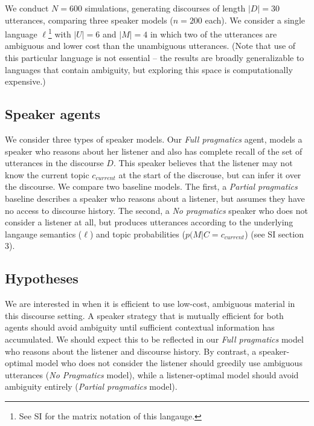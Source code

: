 \documentclass[10pt, letterpaper]{article}
\begin{document}
We conduct \(N=600\) simulations, generating discourses of length
\(|D|=30\) utterances, comparing three speaker models (\(n=200\) each).
We consider a single language
\(\ell\)\footnote{See SI for the matrix notation of this langauge.} with
\(|U|=6\) and \(|M|=4\) in which two of the utterances are ambiguous and
lower cost than the unambiguous utterances. (Note that use of this
particular language is not essential -- the results are broadly
generalizable to languages that contain ambiguity, but exploring this
space is computationally expensive.)\par

\subsection{Speaker agents}\label{speaker-agents}

We consider three types of speaker models. Our \textit{Full pragmatics}
agent, models a speaker who reasons about her listener and also has
complete recall of the set of utterances in the discourse \(D\). This
speaker believes that the listener may not know the current topic
\(c_{current}\) at the start of the discrouse, but can infer it over the
discourse. We compare two baseline models. The first, a
\textit{Partial pragmatics} baseline describes a speaker who reasons
about a listener, but assumes they have no access to discourse history.
The second, a \textit{No pragmatics} speaker who does not consider a
listener at all, but produces utterances according to the underlying
langauge semantics (\(\ell\)) and topic probabilities
(\(p(M|C=c_{current}\)) (see SI section 3).\par

\subsection{Hypotheses}\label{hypotheses}

We are interested in when it is efficient to use low-cost, ambiguous
material in this discourse setting. A speaker strategy that is mutually
efficient for both agents should avoid ambiguity until sufficient
contextual information has accumulated. We should expect this to be
reflected in our \textit{Full pragmatics} model who reasons about the
listener and discourse history. By contrast, a speaker-optimal model who
does not consider the listener should greedily use ambiguous utterances
(\textit{No Pragmatics} model), while a listener-optimal model should
avoid ambiguity entirely (\textit{Partial pragmatics} model).\par
\end{document}
